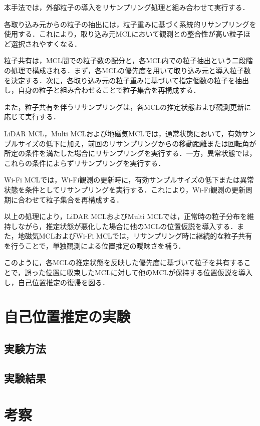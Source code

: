 本手法では，外部粒子の導入をリサンプリング処理と組み合わせて実行する．

各取り込み元からの粒子の抽出には，粒子重みに基づく系統的リサンプリングを使用する．これにより，取り込み元MCLにおいて観測との整合性が高い粒子ほど選択されやすくなる．

粒子共有は，MCL間での粒子数の配分と，各MCL内での粒子抽出という二段階の処理で構成される．まず，各MCLの優先度を用いて取り込み元と導入粒子数を決定する．次に，各取り込み元の粒子重みに基づいて指定個数の粒子を抽出し，自身の粒子と組み合わせることで粒子集合を再構成する．

また，粒子共有を伴うリサンプリングは，各MCLの推定状態および観測更新に応じて実行する．

LiDAR MCL，Multi MCLおよび地磁気MCLでは，通常状態において，有効サンプルサイズの低下に加え，前回のリサンプリングからの移動距離または回転角が所定の条件を満たした場合にリサンプリングを実行する．一方，異常状態では，これらの条件によらずリサンプリングを実行する．

Wi-Fi MCLでは，Wi-Fi観測の更新時に，有効サンプルサイズの低下または異常状態を条件としてリサンプリングを実行する．これにより，Wi-Fi観測の更新周期に合わせて粒子集合を再構成する．

以上の処理により，LiDAR MCLおよびMulti MCLでは，正常時の粒子分布を維持しながら，推定状態が悪化した場合に他のMCLの位置仮説を導入する．また，地磁気MCLおよびWi-Fi MCLでは，リサンプリング時に継続的な粒子共有を行うことで，単独観測による位置推定の曖昧さを補う．

このように，各MCLの推定状態を反映した優先度に基づいて粒子を共有することで，誤った位置に収束したMCLに対して他のMCLが保持する位置仮説を導入し，自己位置推定の復帰を図る．
\section{自己位置推定の実験}
\subsection{実験方法}

\subsection{実験結果}

\section{考察}



